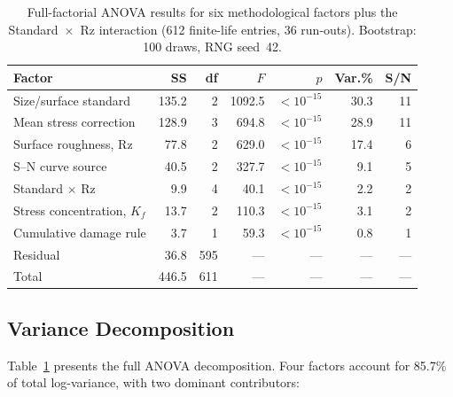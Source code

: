 \documentclass[12pt,a4paper]{article}
\begin{document}
\begin{table}[h]
\centering
\caption{Full-factorial ANOVA results for six methodological factors plus
the Standard~$\times$~Rz interaction (612 finite-life entries, 36 run-outs).
Bootstrap: 100 draws, RNG seed~42.}
\label{tab:anova}
\begin{tabular}{lrrrrrr}
\toprule
Factor & SS & df & $F$ & $p$ & Var.\% & S/N \\
\midrule
Size/surface standard & 135.2 & 2 & 1092.5 & $<10^{-15}$ & 30.3 & 11 \\
Mean stress correction & 128.9 & 3 & 694.8 & $<10^{-15}$ & 28.9 & 11 \\
Surface roughness, Rz & 77.8 & 2 & 629.0 & $<10^{-15}$ & 17.4 & 6 \\
S--N curve source & 40.5 & 2 & 327.7 & $<10^{-15}$ & 9.1 & 5 \\
Standard $\times$ Rz & 9.9 & 4 & 40.1 & $<10^{-15}$ & 2.2 & 2 \\
Stress concentration, $K_f$ & 13.7 & 2 & 110.3 & $<10^{-15}$ & 3.1 & 2 \\
Cumulative damage rule & 3.7 & 1 & 59.3 & $<10^{-15}$ & 0.8 & 1 \\
\midrule
Residual & 36.8 & 595 & --- & --- & --- & --- \\
Total & 446.5 & 611 & --- & --- & --- & --- \\
\bottomrule
\end{tabular}
\end{table}

\subsection{Variance Decomposition}

Table~\ref{tab:anova} presents the full ANOVA decomposition. Four factors
account for 85.7\% of total log-variance, with two dominant contributors:
\end{document}
